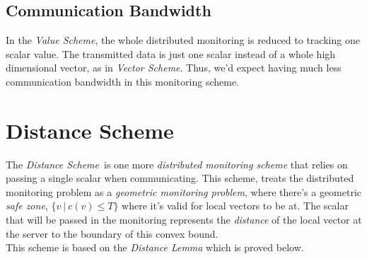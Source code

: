 \documentclass[10pt, conference]{IEEEtran}
\newcommand{\vectorScheme}{\textit{Vector Scheme}}
\newcommand{\valueScheme}{\textit{Value Scheme}}
\newcommand{\distanceScheme}{\textit{Distance Scheme}}
\begin{document}
\subsection{Communication Bandwidth}
In the \valueScheme , the whole distributed monitoring is reduced to tracking one scalar value. The transmitted data is just one scalar instead of a whole high dimensional vector, as in \vectorScheme . Thus, we'd expect having much less communication bandwidth in this monitoring scheme.

\section{Distance Scheme}
The \distanceScheme \ is one more \textit{distributed monitoring scheme} that relies on passing a single scalar when communicating. This scheme, treats the distributed monitoring problem as a \textit{geometric monitoring problem}, where there's a geometric \textit{safe zone}, ${\{v \ | \ c(v) \leq T\}}$ where it's valid for local vectors to be at. The scalar that will be passed in the monitoring represents the \textit{distance} of the local vector at the server to the boundary of this convex bound.\\
This scheme is based on the \textit{Distance Lemma} which is proved below.
\end{document}

